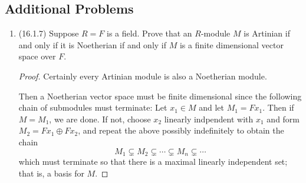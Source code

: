 \documentclass[11pt]{article}
\begin{document}
\subsection*{Additional Problems}
\begin{enumerate}
    \item (16.1.7) Suppose $R = F$ is a field. Prove that an $R$-module $M$ is Artinian if and only if it is Noetherian if and only if $M$ is a finite dimensional vector space over $F$. \begin{proof}
        Certainly every Artinian module is also a Noetherian module.
        
        Then a Noetherian vector space must be finite dimensional since the following chain of submodules must terminate: Let $x_1\in M$ and let $M_1 = Fx_1$. Then if $M= M_1$, we are done. If not, choose $x_2$ linearly indpendent with $x_1$ and form $M_2 = Fx_1\oplus Fx_2$, and repeat the above possibly indefinitely to obtain the chain \[M_1\subsetneq M_2 \subsetneq\cdots\subsetneq M_n\subsetneq \cdots\] which must terminate so that there is a maximal linearly independent set; that is, a basis for $M$.


\end{proof}
\end{enumerate}
\end{document}
